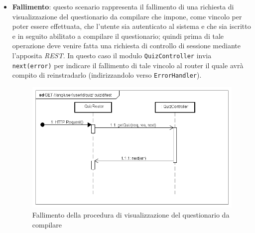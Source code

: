 \begin{itemize}
\item \textbf{Fallimento}: questo scenario rappresenta il fallimento di una richiesta di visualizzazione del questionario da compilare che impone, come vincolo per poter essere effettuata, che l'utente sia autenticato al sistema e che sia iscritto e in seguito abilitato a compilare il questionario; quindi prima di tale operazione deve venire fatta una richiesta di controllo di sessione mediante l'apposita \textit{REST}. In questo caso il modulo \texttt{QuizController} invia \texttt{next(error)} per indicare il fallimento di tale vincolo al router il quale avrà compito di reinstradarlo (indirizzandolo verso \texttt{ErrorHandler}).
\label{Fallimento della procedura di visualizzazione del questionario da compilare}
\begin{figure}[ht]
	\centering
	\includegraphics[scale=0.40]{UML/DiagrammiDiSequenza/Back-end/GET__lang_user_userId_quiz_quizId_test_failure.png}
	\caption{Fallimento della procedura di visualizzazione del questionario da compilare}
\end{figure}
\FloatBarrier
\end{itemize}

